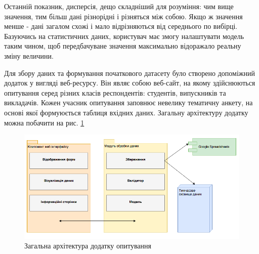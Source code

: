 Останній показник, дисперсія, дещо складніший для розуміння: чим вище значення, тим більш дані різнорідні і різняться між собою. Якщо ж значення менше - дані загалом схожі і мало відрізняються від середнього по вибірці. Базуючись на статистичних даних, користувач має змогу налаштувати модель таким чином, щоб передбачуване значення максимально відоражало реальну зміну величини.

Для збору даних та формування початкового датасету було створено допоміжний додаток у вигляді веб-ресурсу. Він являє собою веб-сайт, на якому здійснюються опитування серед різних класів респондентів: студентів, випускників та викладачів. Кожен учасник опитування заповнює невелику тематичну анкету, на основі якої формуюється таблиця вхідних даних. Загальну архітектуру додатку можна побачити на рис. \ref{fig:poll_architecture} 

\begin{figure}[h!]
  \includegraphics[width=\linewidth]{figures/poll_architecture.png}
  \caption{Загальна архітектура додатку опитування}
  \label{fig:poll_architecture}
\end{figure}

